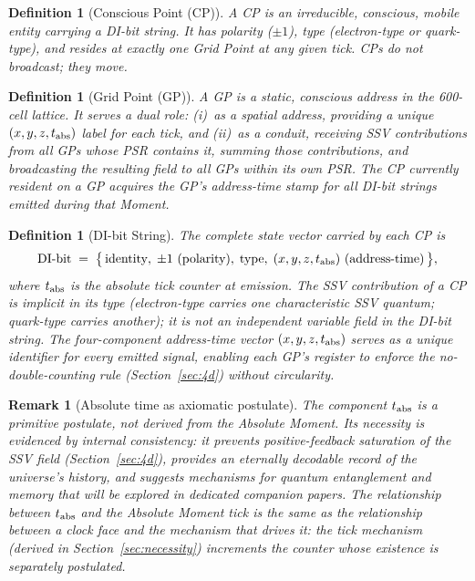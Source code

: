 \documentclass[12pt]{article}
\newtheorem{definition}[theorem]{Definition}
\newtheorem{remark}[theorem]{Remark}
\begin{document}
\begin{definition}[Conscious Point (CP)]
A CP is an irreducible, conscious, mobile entity carrying a DI-bit string.
It has polarity ($\pm 1$), type (electron-type or quark-type), and resides at
exactly one Grid Point at any given tick.  CPs do not broadcast; they move.
\end{definition}

\begin{definition}[Grid Point (GP)]
A GP is a static, conscious address in the 600-cell lattice.  It serves a
\emph{dual role}: (i)~as a \emph{spatial address}, providing a unique
$(x,y,z,t_{\rm abs})$ label for each tick, and (ii)~as a \emph{conduit},
receiving SSV contributions from all GPs whose PSR contains it, summing those
contributions, and broadcasting the resulting field to all GPs within its own
PSR.  The CP currently resident on a GP acquires the GP's address-time stamp
for all DI-bit strings emitted during that Moment.
\end{definition}

\begin{definition}[DI-bit String]
The complete state vector carried by each CP is
\begin{equation}
  \text{DI-bit} \;=\;
  \bigl\{\,\text{identity},\; \pm1\ (\text{polarity}),\;
  \text{type},\; (x,y,z,t_{\rm abs})\ (\text{address-time})\,\bigr\},
  \label{eq:dibit}
\end{equation}
where $t_{\rm abs}$ is the absolute tick counter at emission.  The SSV
contribution of a CP is \emph{implicit in its type} (electron-type carries
one characteristic SSV quantum; quark-type carries another); it is
\emph{not} an independent variable field in the DI-bit string.  The
four-component address-time vector $(x,y,z,t_{\rm abs})$ serves as a
unique identifier for every emitted signal, enabling each GP's register
to enforce the no-double-counting rule (Section~\ref{sec:4d}) without
circularity.
\end{definition}

\begin{remark}[Absolute time as axiomatic postulate]
The component $t_{\rm abs}$ is a \emph{primitive postulate}, not derived from
the Absolute Moment.  Its necessity is evidenced by internal consistency: it
prevents positive-feedback saturation of the SSV field
(Section~\ref{sec:4d}), provides an eternally decodable record of the
universe's history, and suggests mechanisms for quantum entanglement and
memory that will be explored in dedicated companion papers.  The relationship
between $t_{\rm abs}$ and the Absolute Moment tick is the same as the
relationship between a clock face and the mechanism that drives it: the tick
mechanism (derived in Section~\ref{sec:necessity}) increments the counter
whose existence is separately postulated.
\end{remark}
\end{document}
